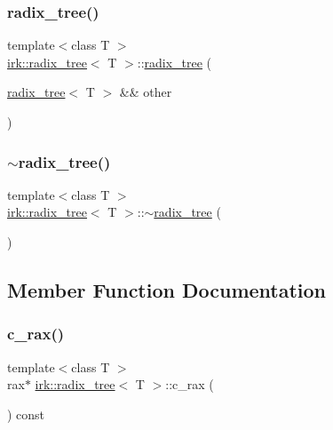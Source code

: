 \subsubsection{\texorpdfstring{radix\+\_\+tree()}{radix\_tree()}\hspace{0.1cm}{\footnotesize\ttfamily [3/3]}}
{\footnotesize\ttfamily template$<$class T $>$ \\
\mbox{\hyperlink{classirk_1_1radix__tree}{irk\+::radix\+\_\+tree}}$<$ T $>$\+::\mbox{\hyperlink{classirk_1_1radix__tree}{radix\+\_\+tree}} (\begin{DoxyParamCaption}\item[{\mbox{\hyperlink{classirk_1_1radix__tree}{radix\+\_\+tree}}$<$ T $>$ \&\&}]{other }\end{DoxyParamCaption})\hspace{0.3cm}{\ttfamily [delete]}}

\mbox{\label{classirk_1_1radix__tree_a32491327f9b61b14c88f38ef6fd09a9f}} 
\subsubsection{\texorpdfstring{$\sim$radix\+\_\+tree()}{~radix\_tree()}}
{\footnotesize\ttfamily template$<$class T $>$ \\
\mbox{\hyperlink{classirk_1_1radix__tree}{irk\+::radix\+\_\+tree}}$<$ T $>$\+::$\sim$\mbox{\hyperlink{classirk_1_1radix__tree}{radix\+\_\+tree}} (\begin{DoxyParamCaption}{ }\end{DoxyParamCaption})\hspace{0.3cm}{\ttfamily [inline]}}



\subsection{Member Function Documentation}
\mbox{\label{classirk_1_1radix__tree_aed4255775e1f9f2a4647e80a408c9946}} 
\subsubsection{\texorpdfstring{c\+\_\+rax()}{c\_rax()}}
{\footnotesize\ttfamily template$<$class T $>$ \\
rax$\ast$ \mbox{\hyperlink{classirk_1_1radix__tree}{irk\+::radix\+\_\+tree}}$<$ T $>$\+::c\+\_\+rax (\begin{DoxyParamCaption}{ }\end{DoxyParamCaption}) const\hspace{0.3cm}{\ttfamily [inline]}}

